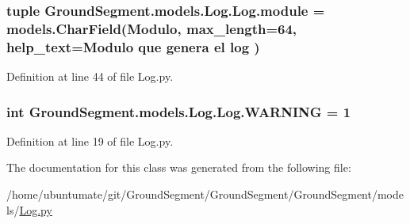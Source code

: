 \subsubsection[{module}]{\setlength{\rightskip}{0pt plus 5cm}tuple Ground\+Segment.\+models.\+Log.\+Log.\+module = models.\+Char\+Field(\textquotesingle{}Modulo\textquotesingle{}, max\+\_\+length=64, help\+\_\+text=\textquotesingle{}Modulo que genera el log\textquotesingle{} )\hspace{0.3cm}{\ttfamily [static]}}\label{class_ground_segment_1_1models_1_1_log_1_1_log_a641912d76965a5802c808ca609194bf2}


Definition at line 44 of file Log.\+py.

\hypertarget{class_ground_segment_1_1models_1_1_log_1_1_log_a36e7a5112aeccaa699704764d43e46dd}{}
\subsubsection[{W\+A\+R\+N\+I\+N\+G}]{\setlength{\rightskip}{0pt plus 5cm}int Ground\+Segment.\+models.\+Log.\+Log.\+W\+A\+R\+N\+I\+N\+G = 1\hspace{0.3cm}{\ttfamily [static]}}\label{class_ground_segment_1_1models_1_1_log_1_1_log_a36e7a5112aeccaa699704764d43e46dd}


Definition at line 19 of file Log.\+py.



The documentation for this class was generated from the following file\+:\begin{DoxyCompactItemize}
\item 
/home/ubuntumate/git/\+Ground\+Segment/\+Ground\+Segment/\+Ground\+Segment/models/\hyperlink{_log_8py}{Log.\+py}\end{DoxyCompactItemize}
